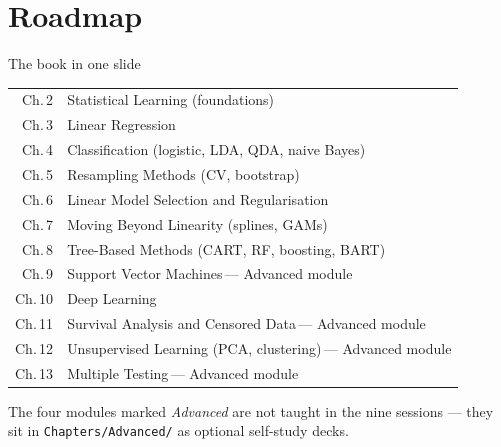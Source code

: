 \documentclass[aspectratio=169,11pt]{beamer}
\begin{document}
\section{Roadmap}

\begin{frame}{The book in one slide}
  \begin{tabular}{rl}
    \toprule
    Ch.\,2  & Statistical Learning (foundations) \\
    Ch.\,3  & Linear Regression \\
    Ch.\,4  & Classification (logistic, LDA, QDA, naive Bayes) \\
    Ch.\,5  & Resampling Methods (CV, bootstrap) \\
    Ch.\,6  & Linear Model Selection and Regularisation \\
    Ch.\,7  & Moving Beyond Linearity (splines, GAMs) \\
    Ch.\,8  & Tree-Based Methods (CART, RF, boosting, BART) \\
    Ch.\,9  & Support Vector Machines\,{\color{black!45}--- Advanced module} \\
    Ch.\,10 & Deep Learning \\
    Ch.\,11 & Survival Analysis and Censored Data\,{\color{black!45}--- Advanced module} \\
    Ch.\,12 & Unsupervised Learning (PCA, clustering)\,{\color{black!45}--- Advanced module} \\
    Ch.\,13 & Multiple Testing\,{\color{black!45}--- Advanced module} \\
    \bottomrule
  \end{tabular}
  \vspace{1mm}

  {\scriptsize The four modules marked \emph{Advanced} are not taught in the nine sessions ---
  they sit in \texttt{Chapters/Advanced/} as optional self-study decks.}
\end{frame}
\end{document}
